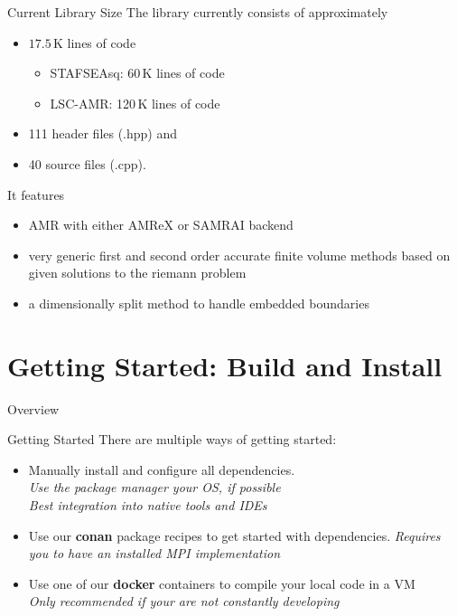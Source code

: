 \documentclass[ucs,9pt]{beamer}
\begin{document}
\begin{frame}{Current Library Size}
The library currently consists of approximately
\begin{itemize}
	\item $17.5$\,K lines of code
	\begin{itemize}
		\item STAFSEAsq: 60\,K lines of code
		\item LSC-AMR: 120\,K lines of code
	\end{itemize}
    \item 111 header files (.hpp) and 
    \item 40 source files (.cpp).
\end{itemize}

\vspace{1cm}
It features
\begin{itemize}
	\item AMR with either AMReX or SAMRAI backend
	\item very generic first and second order accurate finite volume methods based on given solutions to the riemann problem
	\item a dimensionally split method to handle embedded boundaries
\end{itemize}
\end{frame}
	
\section{Getting Started: Build and Install}

\begin{frame}{Overview}
\tableofcontents[currentsection]
\end{frame}

\begin{frame}{Getting Started}
There are multiple ways of getting started:

\vspace{0.3cm}
\begin{itemize}
	\item Manually install and configure all dependencies.\\
	      \emph{Use the package manager your OS, if possible}\\
          \emph{Best integration into native tools and IDEs}
          
    \vspace{0.3cm}
	\item Use our \textbf{conan} package recipes to get started with dependencies.
	      \emph{Requires you to have an installed MPI implementation}

    \vspace{0.3cm}
	\item Use one of our \textbf{docker} containers to compile your local code in a VM\\
	      \emph{Only recommended if your are not constantly developing} 
\end{itemize}
\end{frame}
\end{document}
